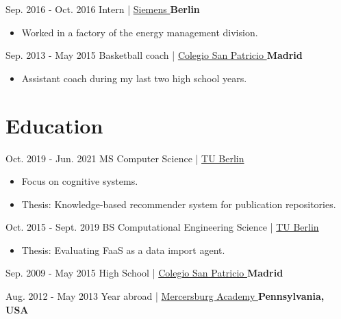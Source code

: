 \documentclass[]{commands}
\begin{document}
\begin{entrylist}
  \entry
    {Sep. 2016 - Oct. 2016}
    {Intern | }
    { \href{https://www.siemens.com/global/en.html}{\small Siemens \faMousePointer}}
    {\normalsize\textbf{\color{ipsgreen}\faMapMarker\space Berlin}}
    {\jobspace
    \begin{itemize}[leftmargin=*, itemsep = 0.1em]
        \item Worked in a factory of the energy management division. \\
    \end{itemize}}
    
  \entry
    {Sep. 2013 - May 2015}
    {Basketball coach | }
    { \href{https://colegiosanpatriciomadrid.com/en/our-campuses/school-el-soto/extra-curricular-activities/}{\small Colegio San Patricio \faMousePointer}}
    {\normalsize\textbf{\color{ipsgreen}\faMapMarker\space Madrid}}
    {\jobspace
    \begin{itemize}[leftmargin=*, itemsep = 0.1em]
        \item Assistant coach during my last two high school years. \\
    \end{itemize}}
    
\end{entrylist}

\section{Education}
\begin{entrylist}
 
   \entry
    {Oct. 2019 - Jun. 2021}
    {MS Computer Science | }
    { \href{https://www.tu.berlin/en/}{\small TU Berlin \faMousePointer}}
    {}
    {\jobspace
    \begin{itemize}[leftmargin=*, itemsep = 0.1em]
        \item Focus on cognitive systems.
        \item Thesis: Knowledge-based recommender system for publication repositories.\\
    \end{itemize}}
    
  \entry
    {Oct. 2015 - Sept. 2019}
    {BS Computational Engineering Science | }
    { \href{https://www.tu.berlin/en/}{\small TU Berlin \faMousePointer}}
    {}
    {\jobspace
    \begin{itemize}[leftmargin=*, itemsep = 0.1em]
        \item Thesis: Evaluating FaaS as a data import agent.\\
    \end{itemize}}

  \entry
    {Sep. 2009 - May 2015}
    {High School | }
    { \href{https://colegiosanpatriciomadrid.com/en}{\small Colegio San Patricio \faMousePointer}}    {\normalsize\textbf{\color{ipsgreen}\faMapMarker\space Madrid}}
    {}
    
  \entry
    {Aug. 2012 - May 2013}
    {Year abroad | }
    { \href{https://www.mercersburg.edu/}{\small Mercersburg Academy \faMousePointer}}    {\normalsize\textbf{\color{ipsgreen}\faMapMarker\space Pennsylvania, USA}}
    {}
\end{entrylist}
\end{document}
